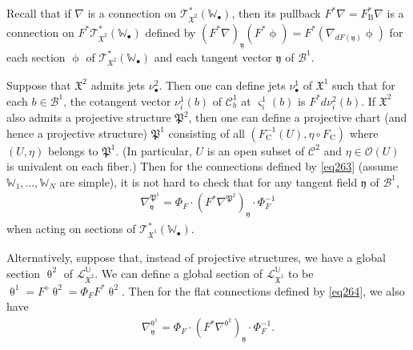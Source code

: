 \documentclass[12pt,a4paper,notitlepage]{report}
\theoremstyle{definition}
\theoremstyle{plain}
\newcommand{\fk}{\mathfrak}
\newcommand{\mc}{\mathcal}
\newcommand{\scr}{\mathscr}
\newcommand{\yk}{\mathfrak y}
\newcommand{\sgm}{\varsigma}
\newcommand{\blt}{\bullet}
\newcommand{\Ubb}{\mathbb U}
\newcommand{\Wbb}{\mathbb W}
\newcommand{\Crm}{\mathrm C}
\newcommand{\Brm}{\mathrm B}
\numberwithin{equation}{section}
\begin{document}
Recall that if $\nabla$ is a connection on $\scr T_{\fk X^2}^*(\Wbb_\blt)$, then its pullback $F^*\nabla=F_\Brm^*\nabla$ is a connection on $F^*\scr T_{\fk X^2}^*(\Wbb_\blt)$ defined by $(F^*\nabla)_{\yk}(F^*\upphi)=F^*(\nabla_{dF(\yk)}\upphi)$ for each section $\upphi$ of $\scr T_{\fk X^2}^*(\Wbb_\blt)$ and each tangent vector $\yk$ of $\mc B^1$. 

Suppose that $\fk X^2$ admits jets $\nu_\blt^2$. Then one can define jets $\nu_\blt^1$ of $\fk X^1$ such that for each $b\in\mc B^1$, the cotangent vector $\nu^1_i(b)$ of $\mc C^1_b$ at $\sgm^1_i(b)$ is $F^*d\nu_i^2(b)$. If $\fk X^2$ also admits a projective structure $\fk P^2$, then one can define a projective chart (and hence a projective structure) $\fk P^1$ consisting of all $(F_\Crm^{-1}(U),\eta\circ F_\Crm)$ where $(U,\eta)$ belongs to $\fk P^1$. (In particular, $U$ is an open subset of $\mc C^2$ and $\eta\in\scr O(U)$ is univalent on each fiber.) Then for the connections defined by \eqref{eq263} (assume $\Wbb_1,\dots,\Wbb_N$ are simple), it is not hard to check that for any tangent field $\yk$ of $\mc B^1$,
\begin{align}
\nabla^{\fk P^1}_\yk=\Phi_F\cdot (F^*\nabla^{\fk P^2})_\yk \cdot \Phi_F^{-1}\label{eq265}
\end{align}
when acting on sections of $\scr T_{\fk X^1}^*(\Wbb_\blt)$.


Alternatively, suppose that, instead of projective structures, we have a global section $\uptheta^2$ of $\scr L_{\fk X^2}^\Ubb$. We can define a global section of $\scr L_{\fk X^1}^\Ubb$ to be $\uptheta^1=F^\diamond\uptheta^2=\Phi_F F^*\uptheta^2$. Then for the flat connections defined by \eqref{eq264}, we also have
\begin{align}
\nabla^{\uptheta^1}_\yk=\Phi_F\cdot (F^*\nabla^{\uptheta^2})_\yk \cdot \Phi_F^{-1}.
\end{align}
\end{document}
